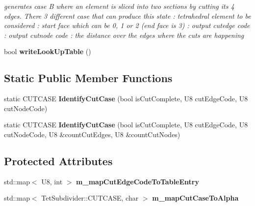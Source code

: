 \begin{DoxyCompactItemize}
\begin{DoxyCompactList}\small\item\em generates case B where an element is sliced into two sections by cutting its 4 edges. There 3 different case that can produce this state \+: tetrahedral element to be considered \+: start face which can be 0, 1 or 2 (end face is 3) \+: output cutedge code \+: output cutnode code \+: the distance over the edges where the cuts are happening \end{DoxyCompactList}\item 
\hypertarget{classps_1_1elastic_1_1TetSubdivider_ae2278f898eb67a69857523183ab70765}{}bool {\bfseries write\+Look\+Up\+Table} ()\label{classps_1_1elastic_1_1TetSubdivider_ae2278f898eb67a69857523183ab70765}

\end{DoxyCompactItemize}
\subsection*{Static Public Member Functions}
\begin{DoxyCompactItemize}
\item 
\hypertarget{classps_1_1elastic_1_1TetSubdivider_a0102d85c9bfa1194fe5172b067e354df}{}static C\+U\+T\+C\+A\+S\+E {\bfseries Identify\+Cut\+Case} (bool is\+Cut\+Complete, U8 cut\+Edge\+Code, U8 cut\+Node\+Code)\label{classps_1_1elastic_1_1TetSubdivider_a0102d85c9bfa1194fe5172b067e354df}

\item 
\hypertarget{classps_1_1elastic_1_1TetSubdivider_a62c3596bb90ef76362552c62c92c290c}{}static C\+U\+T\+C\+A\+S\+E {\bfseries Identify\+Cut\+Case} (bool is\+Cut\+Complete, U8 cut\+Edge\+Code, U8 cut\+Node\+Code, U8 \&count\+Cut\+Edges, U8 \&count\+Cut\+Nodes)\label{classps_1_1elastic_1_1TetSubdivider_a62c3596bb90ef76362552c62c92c290c}

\end{DoxyCompactItemize}
\subsection*{Protected Attributes}
\begin{DoxyCompactItemize}
\item 
\hypertarget{classps_1_1elastic_1_1TetSubdivider_a293adbce753900f3d2d1197b2e3ded54}{}std\+::map$<$ U8, int $>$ {\bfseries m\+\_\+map\+Cut\+Edge\+Code\+To\+Table\+Entry}\label{classps_1_1elastic_1_1TetSubdivider_a293adbce753900f3d2d1197b2e3ded54}

\item 
\hypertarget{classps_1_1elastic_1_1TetSubdivider_af03c8a2d7564db4769a28528105c6935}{}std\+::map$<$ Tet\+Subdivider\+::\+C\+U\+T\+C\+A\+S\+E, char $>$ {\bfseries m\+\_\+map\+Cut\+Case\+To\+Alpha}\label{classps_1_1elastic_1_1TetSubdivider_af03c8a2d7564db4769a28528105c6935}

\end{DoxyCompactItemize}


